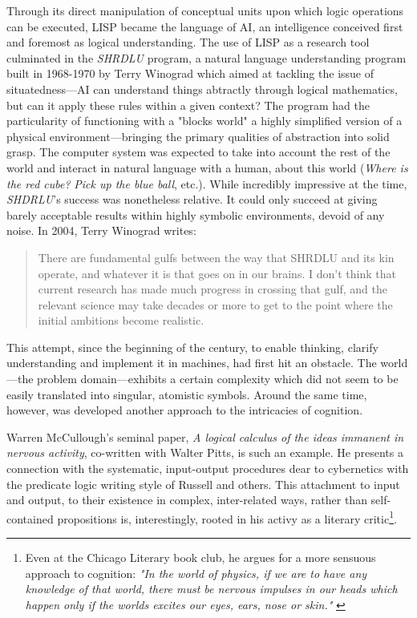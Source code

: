 Through its direct manipulation of conceptual units upon which logic operations can be executed, LISP became the language of AI, an intelligence conceived first and foremost as logical understanding. The use of LISP as a research tool culminated in the \emph{SHRDLU} program, a natural language understanding program built in 1968-1970 by Terry Winograd which aimed at tackling the issue of situatedness—AI can understand things abtractly through logical mathematics, but can it apply these rules within a given context? The program had the particularity of functioning with a "blocks world" a highly simplified version of a physical environment—bringing the primary qualities of abstraction into solid grasp. The computer system was expected to take into account the rest of the world and interact in natural language with a human, about this world (\emph{Where is the red cube?} \emph{Pick up the blue ball}, etc.). While incredibly impressive at the time, \emph{SHDRLU}'s success was nonetheless relative. It could only succeed at giving barely acceptable results within highly symbolic environments, devoid of any noise. In 2004, Terry Winograd writes:

\begin{quote}
    There are fundamental gulfs between the way that SHRDLU and its kin operate, and whatever it is that goes on in our brains. I don’t think that current research has made much progress in crossing that gulf, and the relevant science may take decades or more to get to the point where the initial ambitions become realistic. \cite{nilsson_quest_2009}
\end{quote}

This attempt, since the beginning of the century, to enable thinking, clarify understanding and implement it in machines, had first hit an obstacle. The world—the problem domain—exhibits a certain complexity which did not seem to be easily translated into singular, atomistic symbols. Around the same time, however, was developed another approach to the intricacies of cognition.

Warren McCullough's seminal paper, \emph{A logical calculus of the ideas immanent in nervous activity}, co-written with Walter Pitts, is such an example. He presents a connection with the systematic, input-output procedures dear to cybernetics with the predicate logic writing style of Russell and others\citep{mcculloch_logical_1990}. This attachment to input and output, to their existence in complex, inter-related ways, rather than self-contained propositions is, interestingly, rooted in his activy as a literary critic\footnote{Even at the Chicago Literary book club, he argues for a more sensuous approach to cognition: \emph{"In the world of physics, if we are to have any knowledge of that world, there must be nervous impulses in our heads which happen only if the worlds excites our eyes, ears, nose or skin."} \citep{mcculloch_delusion_1953}}.

